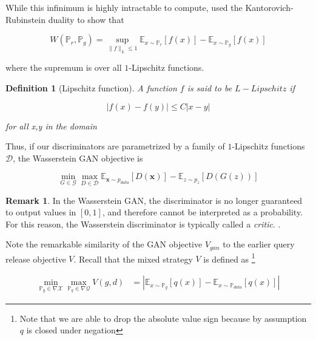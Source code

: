 \documentclass[]{article}
\newcommand{\X}{\mathcal{X}}
\newcommand{\Q}{\mathcal{Q}}
\newcommand{\p}{\mathbb{P}}
\newtheorem{definition}{Definition}[section]
\theoremstyle{definition}
\newtheorem{remark}{Remark}[section]
\begin{document}
    While this infinimum is highly intractable to compute, \cite{ACB17} used the Kantorovich-Rubinstein duality \cite{Vil08} to show that

    \begin{equation}
        W(\mathbb{P}_r, \mathbb{P}_g) = \sup _{\|f\|_L \leq 1} \mathbb{E}_{x\sim \mathbb{P}_r}[f(x)] - \mathbb{E}_{x\sim \mathbb{P}_g}[f(x)]
    \end{equation}

    where the supremum is over all $1$-Lipschitz functions.

    \begin{definition}[Lipschitz function]
        A function $f$ is said to be $L-Lipschitz$ if 

        \begin{equation}
            |f(x) - f(y)| \leq C|x-y|
        \end{equation}

        for all x,y in the domain
    \end{definition}
    
    
    Thus, if our discriminators are parametrized by a family of $1$-Lipschitz functions $\mathcal{D}$, the Wasserstein GAN objective is
    
    \begin{equation}
        \min_{G \in \mathcal{G}} \max_{D \in \mathcal{D}} \mathbb{E}_{\mathbf{x} \sim p_{data}} [D(\mathbf{x})] - \mathbb{E}_{z \sim p_{z}} [D(G(z))]
    \end{equation}

\begin{remark}
    In the Wasserstein GAN, the discriminator is no longer guaranteed to output values in $[0,1]$, and therefore cannot be interpreted as a probability. For this reason, the Wasserstein discriminator is typically called a \emph{critic}. . 
\end{remark}

Note the remarkable similarity of the GAN objective $V_{gan}$ to the earlier query release objective $V$. Recall that the mixed strategy $V$ is defined as \footnote{Note that we are able to drop the absolute value sign because by assumption $q$ is closed under negation}

\begin{align*}
    \min_{\p_g \in \nabla \X} \max_{\p_q \in \nabla\Q }V(g,d) &= |\mathbb{E}_{x \sim \p_g}[q(x)] - \mathbb{E}_{x \sim \p_{data}}[q(x)]|
\end{align*}
\end{document}
